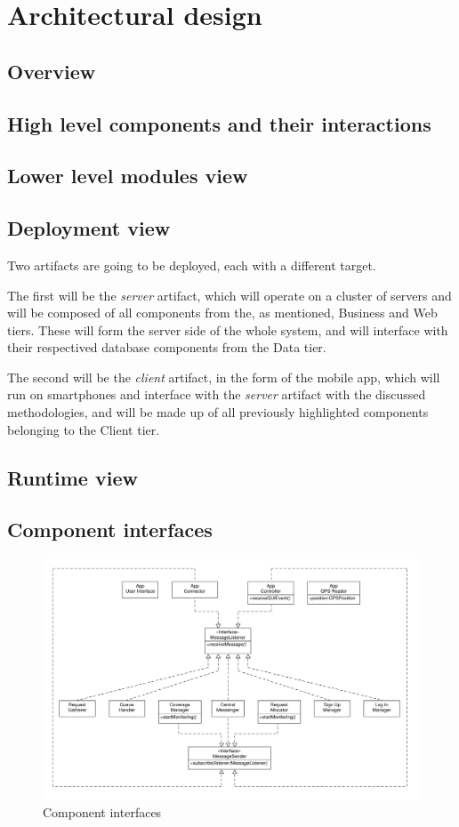 \chapter{Architectural design}

\section{Overview}


\section{High level components and their interactions}


\section{Lower level modules view}


\section{Deployment view}
Two artifacts are going to be deployed, each with a different target.

The first will be the \emph{server} artifact, which will operate on a cluster of servers and will be composed of all components from the, as mentioned, Business and Web tiers. These will form the server side of the whole system, and will interface with their respectived database components from the Data tier.

The second will be the \emph{client} artifact, in the form of the \mts{} mobile app, which will run on smartphones and interface with the \emph{server} artifact with the discussed methodologies, and will be made up of all previously highlighted components belonging to the Client tier.

\section{Runtime view}


\section{Component interfaces}
\begin{figure}
\centering
\includegraphics[width=\textwidth]{tex-images/interfaces}
\caption{Component interfaces}
\end{figure}

